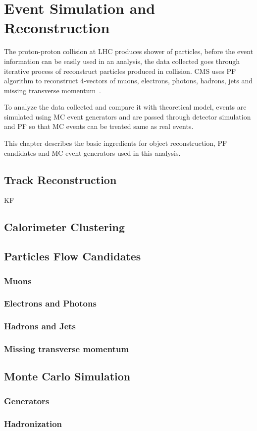 \chapter{
  Event Simulation and Reconstruction
 }\label{ch_reco}

The proton-proton collision at \gls{LHC} produces shower of particles, before
the event information can be easily used in an analysis, the data collected goes
through iterative process of reconstruct particles produced in collision.
\gls{CMS} uses \gls{PF} algorithm to reconstruct 4-vectors of muons, electrons,
photons, hadrons, jets and missing transverse momentum~\cite{cms-particle-flow-2017}.

To analyze the data collected and compare it with theoretical model, events are
simulated using \gls{MC} event generators and are passed through detector simulation
and \gls{PF} so that \gls{MC} events can be treated same as real events.

This chapter describes the basic ingredients for object reconstruction, \gls{PF}
candidates and \gls{MC} event generators used in this analysis.

\section{
  Track Reconstruction
 }

\gls{KF}~\cite{cms-track-reco} \GEANTfour{}

\section{
  Calorimeter Clustering
 }

\section{
  Particles Flow Candidates
 }

\subsection{
  Muons
}

\subsection{
  Electrons and Photons
}

\subsection{
  Hadrons and Jets
}

\subsection{
  Missing transverse momentum
}

\section{
  Monte Carlo Simulation
 }

\subsection{
  Generators
}

\subsection{
  Hadronization
}
